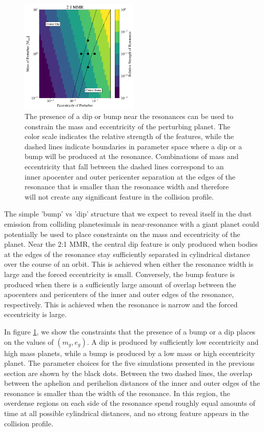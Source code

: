 \documentclass[twocolumn]{aastex63}
\begin{document}
\begin{figure}
\begin{center}
    \includegraphics[width=0.5\textwidth]{figures/bump_dip_diag.png}
    \caption{The presence of a dip or bump near the resonances can be used to constrain the mass and eccentricity
    of the perturbing planet. The color scale indicates the relative strength of the features, while the dashed lines
    indicate boundaries in parameter space where a dip or a bump will be produced at the resonance. Combinations of mass and eccentricity that fall 
    between the dashed lines correspond to an inner apocenter and outer pericenter separation at the edges of the resonance that is smaller than the 
    resonance width and therefore will not create any significant feature in the collision profile.\label{fig:bump_dip_diag}}
\end{center}
\end{figure}

The simple 'bump' vs 'dip' structure that we expect to reveal itself in the dust emission from colliding planetesimals in near-resonance with a giant 
planet could potentially be used to place constraints on the mass and eccentricity of the planet. Near the 2:1 MMR, the central dip feature is only 
produced when bodies at the edges of the resonance stay sufficiently separated in cylindrical distance over the course of an orbit. This is achieved 
when either the resonance width is large and the forced eccentricity is small. Conversely, the bump feature is produced when there is a sufficiently 
large amount of overlap between the apocenters and pericenters of the inner and outer edges of the resonance, respectively. This is achieved when 
the resonance is narrow and the forced eccentricity is large.

In figure \ref{fig:bump_dip_diag}, we show the constraints that the presence of a bump or a dip places on the values of $(m_{g}, e_{g})$. A dip is 
produced by sufficiently low eccentricity and high mass planets, while a bump is produced by a low mass or high eccentricity planet. The parameter 
choices for the five simulations presented in the previous section are shown by the black dots. Between the two dashed lines, the overlap between 
the aphelion and perihelion distances of the inner and outer edges of the resonance is smaller than the width of the resonance. In this region, the 
overdense regions on each side of the resonance spend roughly equal amounts of time at all possible cylindrical distances, and no strong feature 
appears in the collision profile.
\end{document}
